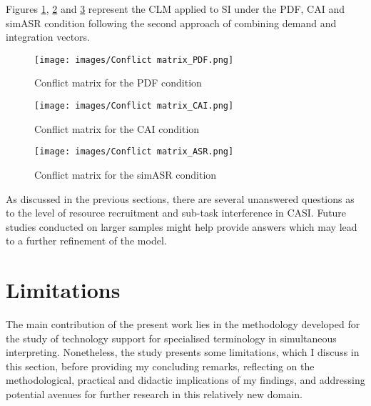 Figures \ref{fig:CM_PDF_final}, \ref{fig:CM_CAI_final} and \ref{fig:CM_ASR_final} represent the CLM applied to SI under the PDF, CAI and simASR condition following the second approach of combining demand and integration vectors.

\begin{figure}
\texttt{[image: images/Conflict matrix\_PDF.png]}
\caption[Conflict matrix: PDF condition]{Conflict matrix for the PDF condition}
\label{fig:CM_PDF_final}
\end{figure}

\begin{figure}
\texttt{[image: images/Conflict matrix\_CAI.png]}
\caption[Conflict matrix: CAI condition]{Conflict matrix for the CAI condition}
\label{fig:CM_CAI_final}
\end{figure}

\begin{figure}
\texttt{[image: images/Conflict matrix\_ASR.png]}
\caption[Conflict matrix: simASR condition]{Conflict matrix for the simASR condition}
\label{fig:CM_ASR_final}
\end{figure}

As discussed in the previous sections, there are several unanswered questions as to the level of resource recruitment and sub-task interference in CASI. Future studies conducted on larger samples might help provide answers which may lead to a further refinement of the model.

\section{Limitations} \label{limitations}\largerpage[2]
The main contribution of the present work lies in the methodology developed for the study of technology support for specialised terminology in simultaneous interpreting. Nonetheless, the study presents some limitations, which I discuss in this section, before providing my concluding remarks, reflecting on the methodological, practical and didactic implications of my findings, and addressing potential avenues for further research in this relatively new domain.
